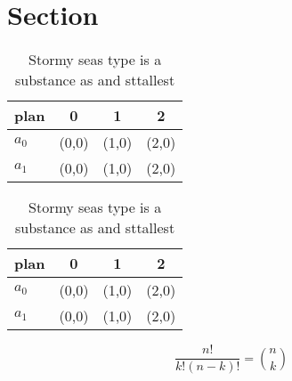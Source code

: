 \documentclass[a4paper]{article}
\begin{document}
\section{Section}

\begin{table}
\begin{adjustbox}{width=0.6\columnwidth}
\begin{tabular}{|l|l|l|l|}
\hline
\textbf{plan} & \multicolumn{1}{c|}{\textbf{0}} & \multicolumn{1}{c|}{\textbf{1}} & \multicolumn{1}{c|}{\textbf{2}} \\ \hline
\textbf{$a_0$}  & (0,0) & (1,0) & (2,0) \\ \hline
\textbf{$a_1$}  & (0,0) & (1,0) & (2,0) \\ \hline
\end{tabular}
\end{adjustbox}
\caption{Stormy seas type is a substance as and sttallest 
}
\end{table}

\begin{table}
\begin{adjustbox}{width=0.6\columnwidth}
\begin{tabular}{|l|l|l|l|}
\hline
\textbf{plan} & \multicolumn{1}{c|}{\textbf{0}} & \multicolumn{1}{c|}{\textbf{1}} & \multicolumn{1}{c|}{\textbf{2}} \\ \hline
\textbf{$a_0$}  & (0,0) & (1,0) & (2,0) \\ \hline
\textbf{$a_1$}  & (0,0) & (1,0) & (2,0) \\ \hline
\end{tabular}
\end{adjustbox}
\caption{Stormy seas type is a substance as and sttallest 
}
\end{table}

\[ \frac{n!}{k!(n-k)!} = \binom{n}{k} \]
\end{document}
